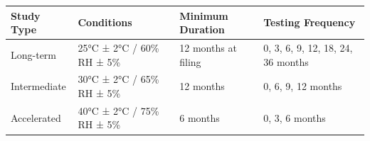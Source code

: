 \documentclass[
  11pt,
  a4paper,
]{report}
\begin{document}
\begin{longtable}[]{@{}llll@{}}
\toprule
\begin{minipage}[b]{0.17\columnwidth}\raggedright
Study Type\strut
\end{minipage} & \begin{minipage}[b]{0.17\columnwidth}\raggedright
Conditions\strut
\end{minipage} & \begin{minipage}[b]{0.26\columnwidth}\raggedright
Minimum Duration\strut
\end{minipage} & \begin{minipage}[b]{0.29\columnwidth}\raggedright
Testing Frequency\strut
\end{minipage}\tabularnewline
\midrule
\endhead
\begin{minipage}[t]{0.17\columnwidth}\raggedright
Long-term\strut
\end{minipage} & \begin{minipage}[t]{0.17\columnwidth}\raggedright
25°C ± 2°C / 60\% RH ± 5\%\strut
\end{minipage} & \begin{minipage}[t]{0.26\columnwidth}\raggedright
12 months at filing\strut
\end{minipage} & \begin{minipage}[t]{0.29\columnwidth}\raggedright
0, 3, 6, 9, 12, 18, 24, 36 months\strut
\end{minipage}\tabularnewline
\begin{minipage}[t]{0.17\columnwidth}\raggedright
Intermediate\strut
\end{minipage} & \begin{minipage}[t]{0.17\columnwidth}\raggedright
30°C ± 2°C / 65\% RH ± 5\%\strut
\end{minipage} & \begin{minipage}[t]{0.26\columnwidth}\raggedright
12 months\strut
\end{minipage} & \begin{minipage}[t]{0.29\columnwidth}\raggedright
0, 6, 9, 12 months\strut
\end{minipage}\tabularnewline
\begin{minipage}[t]{0.17\columnwidth}\raggedright
Accelerated\strut
\end{minipage} & \begin{minipage}[t]{0.17\columnwidth}\raggedright
40°C ± 2°C / 75\% RH ± 5\%\strut
\end{minipage} & \begin{minipage}[t]{0.26\columnwidth}\raggedright
6 months\strut
\end{minipage} & \begin{minipage}[t]{0.29\columnwidth}\raggedright
0, 3, 6 months\strut
\end{minipage}\tabularnewline
\bottomrule
\end{longtable}
\end{document}
